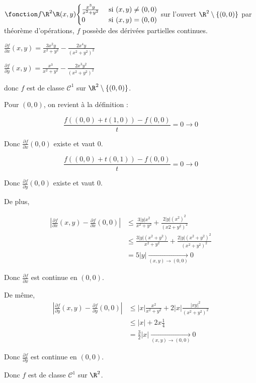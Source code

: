 \begin{exemple}
    $\fonction f {\R^2}{\R}{(x, y)}{\displaystyle \begin{cases}
        \frac{x^3 y}{x^2 + y^2} & \text{ si } (x, y) \neq (0, 0) \\
        0 & \text{ si } (x, y) = (0, 0)
    \end{cases}}$ sur l'ouvert $\R^2 \setminus \{(0, 0)\}$ par théorème d'opérations, 
    $f$ possède des dérivées partielles continues. 

    $\displaystyle \frac{\partial f}{\partial x} (x, y) = \frac{3x^2 y}{x^2 + y^2} - \frac{2x^4 y}{(x^2 + y^2)^2}$

    $\displaystyle \frac{\partial f}{\partial y} (x, y) = \frac{x^3}{x^2 + y^2} - \frac{2x^3 y^2}{(x^2 + y^2)^2}$

    donc $f$ est de classe $\mathscr C^1$ sur $\R^2 \setminus \{(0, 0)\}$.

    Pour $(0, 0)$, on revient à la définition : 

    $$\frac{f((0, 0) + t(1, 0)) - f(0, 0)}{t} = 0 \to 0$$

    Donc $\frac{\partial f}{\partial x}(0, 0)$ existe et vaut $0$.

    $$\frac{f((0, 0) + t(0, 1)) - f(0, 0)}{t} = 0 \to 0$$

    Donc $\frac{\partial f}{\partial y}(0, 0)$ existe et vaut $0$.

    De plus, 

    \begin{align}
        \left| \frac{\partial f}{\partial x}(x, y) - \frac{\partial f}{\partial x}(0, 0) \right| & \leqslant \frac{3 |y| x^2}{x^2 + y^2} + \frac{2 |y| (x^2)^2}{(x2 + y^2)^2} \\
        & \leqslant \frac{3 |y| (x^2 + y^2)}{x^2 + y^2} + \frac{2 |y| (x^2 + y^2)^2}{(x^2 + y^2)^2} \\
        & = 5 |y| \xrightarrow[(x, y) \to (0, 0)]{} 0
    \end{align}

    Donc $\frac{\partial f}{\partial x}$ est continue en $(0, 0)$. 

    De même, 
    \begin{align}
        \left| \frac{\partial f}{\partial y}(x, y) - \frac{\partial f}{\partial y}(0, 0) \right| & \leqslant |x| \frac{x^2}{x^2 + y^2} + 2 |x| \frac{|xy|^2}{(x^2 + y^2)^2} \\
        & \leqslant |x| + 2x \frac 1 4 \\
        & = \frac 3 2 |x| \xrightarrow[(x, y) \to (0, 0)]{} 0
    \end{align}

    Donc $\frac{\partial f}{\partial y}$ est continue en $(0, 0)$.

    Donc $f$ est de classe $\mathscr C^1$ sur $\R^2$.
\end{exemple}

